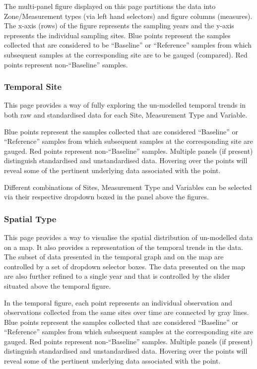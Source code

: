 \documentclass[
  8pt,
  a4paper]{article}
\begin{document}
The multi-panel figure displayed on this page partitions the data into
Zone/Measurement types (via left hand selectors) and figure columns
(measures). The x-axis (rows) of the figure represents the sampling
years and the y-axis represents the individual sampling sites. Blue
points represent the samples collected that are considered to be
``Baseline'' or ``Reference'' samples from which subsequent samples at
the corresponding site are to be gauged (compared). Red points represent
non-``Baseline'' samples.

\subsubsection{Temporal Site}\label{temporal-site}

This page provides a way of fully exploring the un-modelled temporal
trends in both raw and standardised data for each Site, Measurement Type
and Variable.

Blue points represent the samples collected that are considered
``Baseline'' or ``Reference'' samples from which subsequent samples at
the corresponding site are gauged. Red points represent non-``Baseline''
samples. Multiple panels (if present) distinguish standardised and
unstandardised data. Hovering over the points will reveal some of the
pertinent underlying data associated with the point.

Different combinations of Sites, Measurement Type and Variables can be
selected via their respective dropdown boxed in the panel above the
figures.

\subsubsection{Spatial Type}\label{spatial-type}

This page provides a way to visualise the spatial distribution of
un-modelled data on a map. It also provides a representation of the
temporal trends in the data. The subset of data presented in the
temporal graph and on the map are controlled by a set of dropdown
selector boxes. The data presented on the map are also further refined
to a single year and that is controlled by the slider situated above the
temporal figure.

In the temporal figure, each point represents an individual observation
and observations collected from the same sites over time are connected
by gray lines. Blue points represent the samples collected that are
considered ``Baseline'' or ``Reference'' samples from which subsequent
samples at the corresponding site are gauged. Red points represent
non-``Baseline'' samples. Multiple panels (if present) distinguish
standardised and unstandardised data. Hovering over the points will
reveal some of the pertinent underlying data associated with the point.
\end{document}
